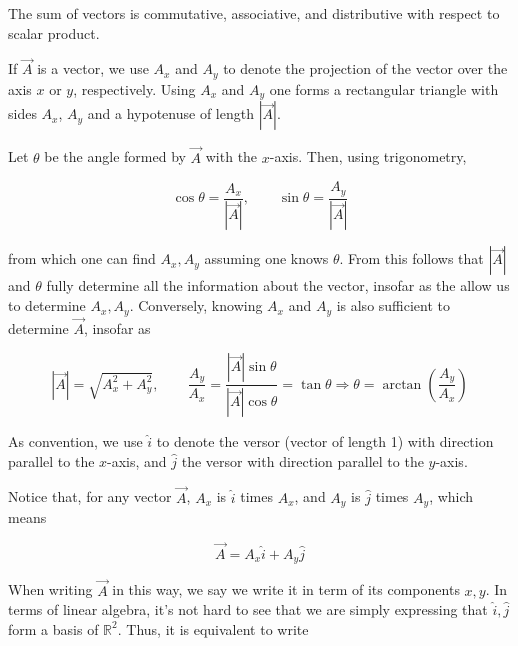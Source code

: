 \documentclass[12pt]{article}
\theoremstyle{definition}
\begin{document}
The sum of vectors is commutative, associative, and distributive with respect to
scalar product.

If $\overrightarrow{A}$ is a vector, we use $A_x$ and $A_y$ to denote the
projection of the vector over the axis $x$ or $y$, respectively. Using $A_x$ and
$A_y$ one forms a rectangular triangle with sides $A_x$, $A_y$ and a hypotenuse 
of length $\left| \overrightarrow{A} \right| $. 

Let $\theta$ be the angle formed
by $\overrightarrow{A}$ with the $x$-axis. Then, using trigonometry,

\begin{equation*}
    \cos \theta = \frac{A_x}{\left| \overrightarrow{A} \right| }, \qquad \sin
    \theta = \frac{A_y}{\left| \overrightarrow{A} \right| }
\end{equation*}

from which one can find $A_x, A_y$ assuming one knows $\theta$. From this
follows that $\left| \overrightarrow{A} \right| $ and $\theta$ fully determine
all the information about the vector, insofar as the allow us to determine $A_x,
A_y$. Conversely, knowing $A_x$ and $A_y$ is also sufficient to determine
$\overrightarrow{A}$, insofar as 

\begin{equation*}
    \left| \overrightarrow{A} \right|  = \sqrt{A_x^2 + A_y^2} , \qquad \frac{A_y}{A_x} =
    \frac{\left| \overrightarrow{A} \right| \sin \theta}{\left|
    \overrightarrow{A} \right|  \cos \theta} = \tan \theta \Rightarrow \theta =
    \arctan \left( \frac{A_y}{A_x} \right) 
\end{equation*}

As convention, we use $\hat{i}$ to denote the versor (vector of length 1) with
direction parallel to the $x$-axis, and $\hat{j}$ the versor with direction
parallel to the $y$-axis.

Notice that, for any vector $\overrightarrow{A}$, $A_x$ is $\hat{i}$ times
$A_x$, and $A_y$ is $\hat{j}$ times $A_y$, which means 

\begin{equation*}
    \overrightarrow{A} = A_x \hat{i} + A_y \hat{j}
\end{equation*}

When writing $\overrightarrow{A}$ in this way, we say we write it in term of its
components $x, y$. In terms of linear algebra, it's not hard to see that we are
simply expressing that $\hat{i}, \hat{j}$  form a basis of $\mathbb{R}^2$. Thus,
it is equivalent to write 
\end{document}
